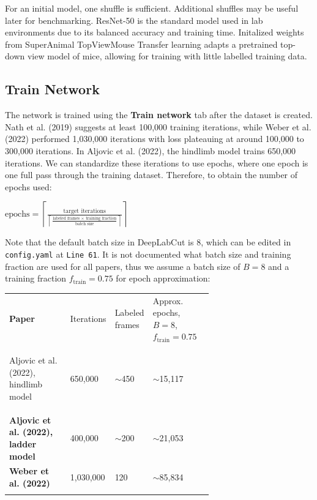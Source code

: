 \documentclass[11pt]{article}
\let\almaToprule\toprule
\let\almaMidrule\midrule
\let\almaBottomrule\bottomrule
\renewcommand{\toprule}{\arrayrulecolor{almaBlue!58}\almaToprule\rowcolor{almaSky!78}}
\renewcommand{\midrule}{\arrayrulecolor{almaBlue!48}\almaMidrule}
\renewcommand{\bottomrule}{\arrayrulecolor{almaBlue!58}\almaBottomrule}
\renewcommand{\[}{%
  \par\smallskip\noindent
  \begin{center}%
  \setlength{\fboxsep}{5pt}%
  \setlength{\fboxrule}{0.35pt}%
  \begin{lrbox}{\almaEquationBox}%
  $\displaystyle
}
\renewcommand{\]}{%
  $%
  \end{lrbox}%
  \fcolorbox{equationLine}{equationBack}{\usebox{\almaEquationBox}}%
  \end{center}%
  \smallskip\par
}
\begin{document}
For an initial model, one shuffle is sufficient. Additional shuffles may be useful later for benchmarking. ResNet-50 is the standard model used in lab environments due to its balanced accuracy and training time. Initalized weights from SuperAnimal TopViewMouse Transfer learning adapts a pretrained top-down view model of mice, allowing for training with little labelled training data. 

\subsection{Train Network}

The network is trained using the \textbf{Train network} tab after the dataset is created. Nath et al. (2019) suggests at least 100,000 training iterations, while Weber et al. (2022) performed 1,030,000 iterations with loss plateauing at around 100,000 to 300,000 iterations. In Aljovic et al. (2022), the hindlimb model trains 650,000 iterations. We can standardize these iterations to use epochs, where one epoch is one full pass through the training dataset. Therefore, to obtain the number of epochs used:
\[
\text{epochs} =
\left\lceil
\frac{\text{target iterations}}
{
\left\lceil 
\frac{\text{labeled frames } \times \text{ training fraction}}
{\text{batch size}}
\right\rceil
}
\right\rceil
\]

Note that the default batch size in DeepLabCut is 8, which can be edited in \texttt{config.yaml} at \texttt{Line 61}. It is not documented what batch size and training fraction are used for all papers, thus we assume a batch size of $B=8$ and a training fraction $f_{\text{train}}=0.75$ for epoch approximation: 

 


\begin{tcolorbox}[blue table box,title=\textbf{Training Amounts and Epoch Equivalents}]
\small
\begin{tabularx}{\linewidth}{>{\bfseries}p{0.30\linewidth} p{0.18\linewidth} p{0.18\linewidth} X}
\toprule
Paper & Iterations & Labeled frames & Approx. epochs, $B=8$, $f_{\text{train}}=0.75$ \\
\midrule

Aljovic et al. (2022), hindlimb model 
& 650,000 
& $\sim$450 
& $\sim$15,117 \\

Aljovic et al. (2022), ladder model 
& 400,000 
& $\sim$200 
& $\sim$21,053 \\

Weber et al. (2022) 
& 1,030,000 
& 120 
& $\sim$85,834 \\

\bottomrule
\end{tabularx}
\end{tcolorbox}
\end{document}
